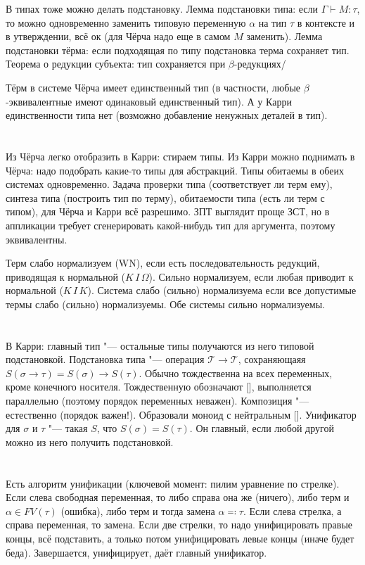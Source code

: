 В типах тоже можно делать подстановку.
Лемма подстановки типа: если $\Gamma \vdash M \colon \tau$, то можно одновременно заменить типовую переменную $\alpha$ на тип $\tau$ в контексте и в
утверждении, всё ок (для Чёрча надо еще в самом $M$ заменить).
Лемма подстановки тёрма: если подходящая по типу подстановка терма сохраняет тип.
Теорема о редукции субъекта: тип сохраняется при $\beta$-редукциях/

Тёрм в системе Чёрча имеет единственный тип (в частности, любые $\beta$-эквивалентные имеют одинаковый единственный тип).
А у Карри единственности типа нет (возможно добавление ненужных деталей в тип).

\section{} %
Из Чёрча легко отобразить в Карри: стираем типы.
Из Карри можно поднимать в Чёрча: надо подобрать какие-то типы для абстракций.
Типы обитаемы в обеих системах одновременно.
Задача проверки типа (соответствует ли терм ему), синтеза типа (построить тип по терму), обитаемости типа
(есть ли терм с типом), для Чёрча и Карри всё разрешимо.
ЗПТ выглядит проще ЗСТ, но в аппликации требует сгенерировать какой-нибудь тип для аргумента, поэтому эквивалентны.

Терм слабо нормализуем (WN), если есть последовательность редукций, приводящая к нормальной ($K\,I\,\Omega$).
Сильно нормализуем, если любая приводит к нормальной ($K\,I\,K$).
Система слабо (сильно) нормализуема если все допустимые термы слабо (сильно) нормализуемы.
Обе системы сильно нормализуемы.

\section{} %
В Карри: главный тип "--- остальные типы получаются из него типовой подстановкой.
Подстановка типа "--- операция $\mathcal T \to \mathcal T$, сохраняющаяя $S(\sigma \to \tau) = S(\sigma) \to S(\tau)$.
Обычно тождественна на всех переменных, кроме конечного носителя.
Тождественную обозначают [], выполняется параллельно (поэтому порядок переменных неважен).
Композиция "--- естественно (порядок важен!).
Образовали моноид с нейтральным [].
Унификатор для $\sigma$ и $\tau$ "--- такая $S$, что $S(\sigma)=S(\tau)$.
Он главный, если любой другой можно из него получить подстановкой.

\section{} %
Есть алгоритм унификации (ключевой момент: пилим уравнение по стрелке).
Если слева свободная переменная, то либо справа она же (ничего), либо терм и $\alpha \in FV(\tau)$ (ошибка),
либо терм и тогда замена $\alpha \eqcolon \tau$.
Если слева стрелка, а справа переменная, то замена.
Если две стрелки, то надо унифицировать правые концы, всё подставить, а только потом унифицировать левые концы (иначе будет беда).
Завершается, унифицирует, даёт главный унификатор.


